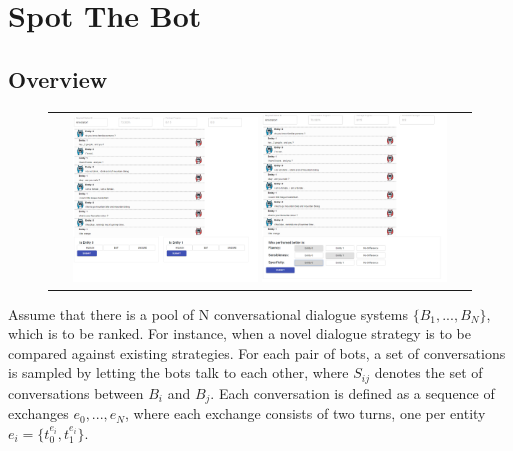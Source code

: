 \documentclass[11pt,a4paper]{article}
\begin{document}
\section{Spot The Bot}
\subsection{Overview}
\begin{figure}[h]
	\begin{center}
        \begin{tabular}{@{}c@{}}
		\includegraphics[width=0.45\textwidth]{figures/AnnotationTool1.png} 
		\includegraphics[width=0.45\textwidth]{figures/AnnotationTool2.png}
       \end{tabular}
	\end{center}\vspace{-3mm}
\label{fig:tool}
\end{figure}
Assume that there is a pool of N conversational dialogue systems $\{B_1, ..., B_N\}$, which is to be ranked. For instance, when a novel dialogue strategy is to be compared against existing strategies. For each pair of bots, a set of conversations is sampled by letting the bots talk to each other, where $S_{ij}$ denotes the set of conversations between $B_i$ and $B_j$. Each conversation is defined as a sequence of exchanges $e_0, ..., e_N$, where each exchange consists of two turns, one per entity $e_i = \{t_0^{e_i}, t_1^{e_i}\}$. 
\end{document}
